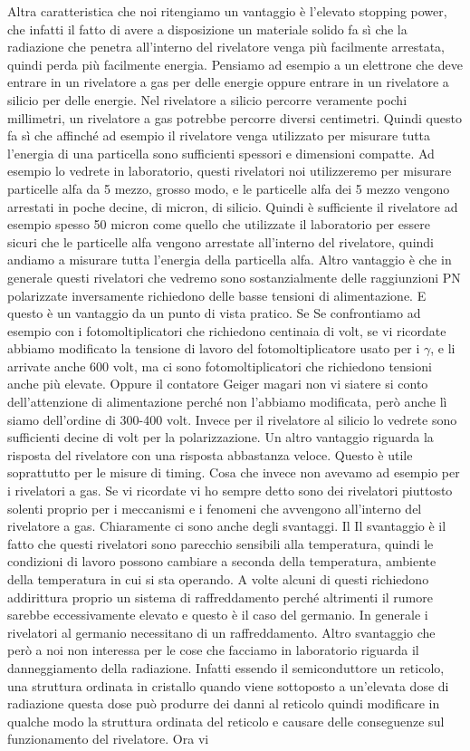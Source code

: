 Altra caratteristica che noi ritengiamo un vantaggio è l'elevato stopping power, che infatti il fatto di avere a disposizione un materiale solido fa sì che la radiazione che penetra all'interno del rivelatore venga più facilmente arrestata, quindi perda più facilmente energia. Pensiamo ad esempio a un elettrone che deve entrare in un rivelatore a gas per delle energie oppure entrare in un rivelatore a silicio per delle energie. Nel rivelatore a silicio percorre veramente pochi millimetri, un rivelatore a gas potrebbe percorre diversi centimetri. Quindi questo fa sì che affinché ad esempio il rivelatore venga utilizzato per misurare tutta l'energia di una particella sono sufficienti spessori e dimensioni compatte. Ad esempio lo vedrete in laboratorio, questi rivelatori noi utilizzeremo per misurare particelle alfa da 5 mezzo, grosso modo, e le particelle alfa dei 5 mezzo vengono arrestati in poche decine, di micron, di silicio. Quindi è sufficiente il rivelatore ad esempio spesso 50 micron come quello che utilizzate il laboratorio per essere sicuri che le particelle alfa vengono arrestate all'interno del rivelatore, quindi andiamo a misurare tutta l'energia della particella alfa. Altro vantaggio è che in generale questi rivelatori che vedremo sono sostanzialmente delle raggiunzioni PN polarizzate inversamente richiedono delle basse tensioni di alimentazione. E questo è un vantaggio da un punto di vista pratico. Se Se confrontiamo ad esempio con i fotomoltiplicatori che richiedono centinaia di volt, se vi ricordate abbiamo modificato la tensione di lavoro del fotomoltiplicatore usato per i $\gamma$, e li arrivate anche 600 volt, ma ci sono fotomoltiplicatori che richiedono tensioni anche più elevate. Oppure il contatore Geiger magari non vi siatere si conto dell'attenzione di alimentazione perché non l'abbiamo modificata, però anche lì siamo dell'ordine di 300-400 volt. Invece per il rivelatore al silicio lo vedrete sono sufficienti decine di volt per la polarizzazione. Un altro vantaggio riguarda la risposta del rivelatore con una risposta abbastanza veloce. Questo è utile soprattutto per le misure di timing. Cosa che invece non avevamo ad esempio per i rivelatori a gas. Se vi ricordate vi ho sempre detto sono dei rivelatori piuttosto solenti proprio per i meccanismi e i fenomeni che avvengono all'interno del rivelatore a gas. Chiaramente ci sono anche degli svantaggi. Il Il svantaggio è il fatto che questi rivelatori sono parecchio sensibili alla temperatura, quindi le condizioni di lavoro possono cambiare a seconda della temperatura, ambiente della temperatura in cui si sta operando. A volte alcuni di questi richiedono addirittura proprio un sistema di raffreddamento perché altrimenti il rumore sarebbe eccessivamente elevato e questo è il caso del germanio. In generale i rivelatori al germanio necessitano di un raffreddamento. Altro svantaggio che però a noi non interessa per le cose che facciamo in laboratorio riguarda il danneggiamento della radiazione. Infatti essendo il semiconduttore un reticolo, una struttura ordinata in cristallo quando viene sottoposto a un'elevata dose di radiazione questa dose può produrre dei danni al reticolo quindi modificare in qualche modo la struttura ordinata del reticolo e causare delle conseguenze sul funzionamento del rivelatore. Ora vi 